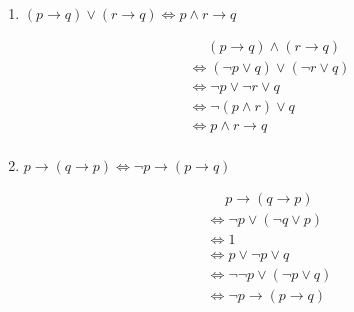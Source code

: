\documentclass[UTF8]{ctexart}
\begin{document}
\begin{enumerate}
\begin{enumerate}
            
            \item  $( p \rightarrow q) \vee (r \rightarrow q) \Leftrightarrow p \wedge r \rightarrow q$
            
            \[
                \begin{aligned}
                    &\mathrel{\phantom{=}} (p\rightarrow q)\wedge (r \rightarrow q)\\
                    &\Leftrightarrow (\neg p \vee q)\vee (\neg r \vee q)\\
                    &\Leftrightarrow \neg p \vee \neg r \vee q\\
                    &\Leftrightarrow \neg(p\wedge r)\vee q\\
                    &\Leftrightarrow p\wedge r \rightarrow q\\
                \end{aligned}
            \]
            
            \item  $p \rightarrow (q \rightarrow p) \Leftrightarrow \neg p \rightarrow ( p \rightarrow q)$
            
            \[
                \begin{aligned}
                    &\mathrel{\phantom{=}} p\rightarrow (q\rightarrow p)\\
                    &\Leftrightarrow \neg p \vee (\neg q \vee p)\\
                    &\Leftrightarrow 1\\
                    &\Leftrightarrow p \vee \neg p \vee q \\
                    &\Leftrightarrow \neg \neg p \vee (\neg p \vee q)\\
                    &\Leftrightarrow \neg p \rightarrow (p \rightarrow q)\\
                \end{aligned}
            \]
            

\end{enumerate}
\end{enumerate}
\end{document}
